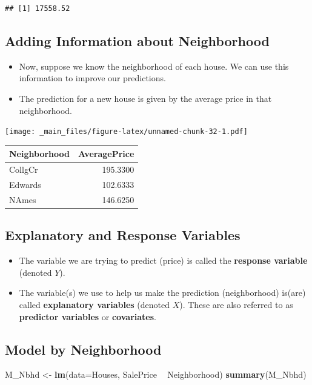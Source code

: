 \documentclass[]{book}
\newenvironment{Shaded}{\begin{snugshade}}{\end{snugshade}}
\newcommand{\KeywordTok}[1]{\textcolor[rgb]{0.13,0.29,0.53}{\textbf{#1}}}
\newcommand{\DataTypeTok}[1]{\textcolor[rgb]{0.13,0.29,0.53}{#1}}
\newcommand{\StringTok}[1]{\textcolor[rgb]{0.31,0.60,0.02}{#1}}
\newcommand{\OperatorTok}[1]{\textcolor[rgb]{0.81,0.36,0.00}{\textbf{#1}}}
\newcommand{\NormalTok}[1]{#1}
\begin{document}
\begin{verbatim}
## [1] 17558.52
\end{verbatim}

\subsection{Adding Information about
Neighborhood}\label{adding-information-about-neighborhood}

\begin{itemize}
\item
  Now, suppose we know the neighborhood of each house. We can use this
  information to improve our predictions.
\item
  The prediction for a new house is given by the average price in that
  neighborhood.
\end{itemize}

\texttt{[image: \_main\_files/figure-latex/unnamed-chunk-32-1.pdf]}

\begin{tabular}{l|r}
\hline
Neighborhood & AveragePrice\\
\hline
CollgCr & 195.3300\\
\hline
Edwards & 102.6333\\
\hline
NAmes & 146.6250\\
\hline
\end{tabular}

\subsection{Explanatory and Response
Variables}\label{explanatory-and-response-variables}

\begin{itemize}
\item
  The variable we are trying to predict (price) is called the
  \textbf{response variable} (denoted \(Y\)).
\item
  The variable(s) we use to help us make the prediction (neighborhood)
  is(are) called \textbf{explanatory variables} (denoted \(X\)). These
  are also referred to as \textbf{predictor variables} or
  \textbf{covariates}.
\end{itemize}

\subsection{Model by Neighborhood}\label{model-by-neighborhood}

\begin{Shaded}
\begin{Highlighting}[]
\NormalTok{M_Nbhd <-}\StringTok{ }\KeywordTok{lm}\NormalTok{(}\DataTypeTok{data=}\NormalTok{Houses, SalePrice }\OperatorTok{~}\StringTok{ }\NormalTok{Neighborhood)}
\KeywordTok{summary}\NormalTok{(M_Nbhd)}
\end{Highlighting}
\end{Shaded}
\end{document}
